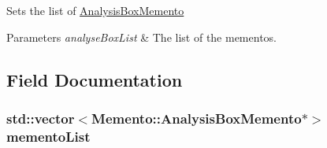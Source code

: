 Sets the list of \hyperlink{classMemento_1_1AnalysisBoxMemento}{Analysis\+Box\+Memento} 


\begin{DoxyParams}{Parameters}
{\em analyse\+Box\+List} & The list of the mementos.\\
\hline
\end{DoxyParams}


\subsection{Field Documentation}
\hypertarget{classMemento_1_1AnalysisBoxContainerMemento_aa6b5ae88f477f23cf3377bd72c2c7bdc}{}
\subsubsection[{memento\+List}]{\setlength{\rightskip}{0pt plus 5cm}std\+::vector$<${\bf Memento\+::\+Analysis\+Box\+Memento}$\ast$$>$ memento\+List\hspace{0.3cm}{\ttfamily [private]}}\label{classMemento_1_1AnalysisBoxContainerMemento_aa6b5ae88f477f23cf3377bd72c2c7bdc}
